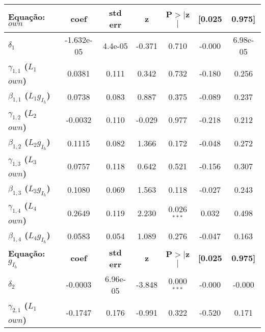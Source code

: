 \label{Estimacao}
\begin{threeparttable}
	\begin{tabular}{lcccccc}
		\hline \hline
		\textbf{Equação:} $own$ & \textbf{coef} & \textbf{std err} & \textbf{z} & \textbf{P$> |$z$|$} & \textbf{[0.025} & \textbf{0.975]}  \\
		\midrule
		\textbf{$\delta_{1}$}      &   -1.632e-05  &      4.4e-05     &    -0.371  &         0.710        &       -0.000    &     6.98e-05     \\
		\textbf{$\gamma_{1,1}$ ($L_1$ $own$)} &       0.0381  &        0.111     &     0.342  &         0.732        &       -0.180    &        0.256     \\
		\textbf{$\beta_{1,1}$ ($L_1 g_{I_h}$)}           &       0.0738  &        0.083     &     0.887  &         0.375        &       -0.089    &        0.237     \\
		\textbf{$\gamma_{1,2}$ ($L_2$ $own$)} &      -0.0032  &        0.110     &    -0.029  &         0.977        &       -0.218    &        0.212     \\
		\textbf{$\beta_{1,2}$ ($L_2 g_{I_h}$)}           &       0.1115  &        0.082     &     1.366  &         0.172        &       -0.048    &        0.272     \\
		\textbf{$\gamma_{1,3}$ ($L_3$ $own$)} &       0.0757  &        0.118     &     0.642  &         0.521        &       -0.156    &        0.307     \\
		\textbf{$\beta_{1,3}$ ($L_3 g_{I_h}$)}           &       0.1080  &        0.069     &     1.563  &         0.118        &       -0.027    &        0.243     \\
		\textbf{$\gamma_{1,4}$ ($L_4$ $own$)} &       0.2649  &        0.119     &     2.230  &         0.026$^{***}$        &        0.032    &        0.498     \\
		\textbf{$\beta_{1,4}$ ($L_4 g_{I_h}$)}           &      0.0583  &        0.054     &    1.089  &         0.276        &       -0.047    &       0.163     \\
		\midrule
		\textbf{Equação:} $g_{I_h}$ & \textbf{coef} & \textbf{std err} & \textbf{z} & \textbf{P$> |$z$|$} & \textbf{[0.025} & \textbf{0.975]}  \\
		\midrule
		\textbf{$\delta_{2}$}      &      -0.0003  &     6.96e-05     &    -3.848  &         0.000$^{***}$        &       -0.000    &       -0.000     \\
		\textbf{$\gamma_{2,1}$ ($L_1$ $own$)} &      -0.1747  &        0.176     &    -0.991  &         0.322        &       -0.520    &        0.171     \\

\end{tabular}
\end{threeparttable}
